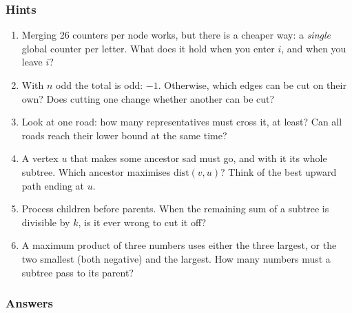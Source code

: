 \subsubsection*{Hints}
\begin{enumerate}[leftmargin=*, label=\textbf{E2.\arabic*}]
    \item Merging 26 counters per node works, but there is a cheaper way: a \emph{single} global counter per letter. What does it hold when you enter $i$, and when you leave $i$?
    \item With $n$ odd the total is odd: $-1$. Otherwise, which edges can be cut on their own? Does cutting one change whether another can be cut?
    \item Look at one road: how many representatives must cross it, at least? Can all roads reach their lower bound at the same time?
    \item A vertex $u$ that makes some ancestor sad must go, and with it its whole subtree. Which ancestor maximises $\mathrm{dist}(v, u)$? Think of the best upward path ending at $u$.
    \item Process children before parents. When the remaining sum of a subtree is divisible by $k$, is it ever wrong to cut it off?
    \item A maximum product of three numbers uses either the three largest, or the two smallest (both negative) and the largest. How many numbers must a subtree pass to its parent?
\end{enumerate}

\subsubsection*{Answers}

